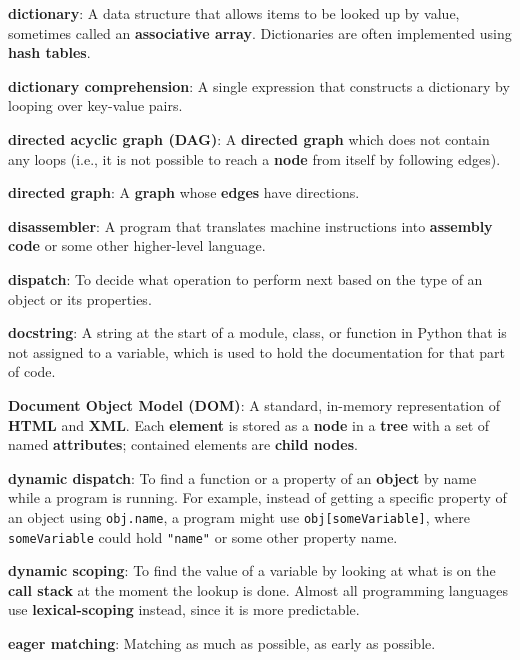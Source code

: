 \documentclass{scrbook}
\newcommand{\glosskey}[1]{\textbf{#1}}
\begin{document}
\noindent \textbf{\glosskey{dictionary}}: 
A data structure that allows items to be looked up by value, sometimes called an \glosskey{associative array}. Dictionaries are often implemented using \glosskey{hash tables}.


\noindent \textbf{\glosskey{dictionary comprehension}}: 
A single expression that constructs a dictionary by looping over key-value pairs.


\noindent \textbf{\glosskey{directed acyclic graph} (DAG)}: 
A \glosskey{directed graph} which does not contain any loops (i.e., it is not possible to reach a \glosskey{node} from itself by following edges).


\noindent \textbf{\glosskey{directed graph}}: 
A \glosskey{graph} whose \glosskey{edges} have directions.


\noindent \textbf{\glosskey{disassembler}}: 
A program that translates machine instructions into \glosskey{assembly code} or some other higher-level language.


\noindent \textbf{\glosskey{dispatch}}: 
To decide what operation to perform next based on the type of an object or its properties.


\noindent \textbf{\glosskey{docstring}}: 
A string at the start of a module, class, or function in Python that is not assigned to a variable, which is used to hold the documentation for that part of code.


\noindent \textbf{\glosskey{Document Object Model} (DOM)}: 
A standard, in-memory representation of \glosskey{HTML} and \glosskey{XML}. Each \glosskey{element} is stored as a \glosskey{node} in a \glosskey{tree} with a set of named \glosskey{attributes}; contained elements are \glosskey{child nodes}.


\noindent \textbf{\glosskey{dynamic dispatch}}: 
To find a function or a property of an \glosskey{object} by name while a program is running. For example, instead of getting a specific property of an object using \texttt{obj.name}, a program might use \texttt{obj[someVariable]}, where \texttt{someVariable} could hold \texttt{"name"} or some other property name.


\noindent \textbf{\glosskey{dynamic scoping}}: 
To find the value of a variable by looking at what is on the \glosskey{call stack} at the moment the lookup is done. Almost all programming languages use \glosskey{lexical-scoping} instead, since it is more predictable.


\noindent \textbf{\glosskey{eager matching}}: 
Matching as much as possible, as early as possible.
\end{document}
